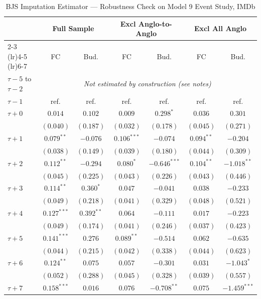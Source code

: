 \begin{table}[htbp]
\centering
\caption{BJS Imputation Estimator --- Robustness Check on Model 9 Event Study, IMDb}
\label{tab:bjs}
\footnotesize
\begin{tabular}{l cc cc cc }
\toprule
  & \multicolumn{2}{c}{Full Sample} & \multicolumn{2}{c}{Excl Anglo-to-Anglo} & \multicolumn{2}{c}{Excl All Anglo} \\
\cmidrule(lr){2-3}
\cmidrule(lr){4-5}
\cmidrule(lr){6-7}
  & FC & Bud. & FC & Bud. & FC & Bud. \\
\midrule
$\tau-5$ to $\tau-2$ & \multicolumn{6}{c}{\textit{Not estimated by construction (see notes)}} \\
$\tau-1$ & ref. & ref. & ref. & ref. & ref. & ref. \\
$\tau+0$ & $0.014$ & $0.102$ & $0.009$ & $0.298^{*}$ & $0.036$ & $0.301$ \\
 & $(0.040)$ & $(0.187)$ & $(0.032)$ & $(0.178)$ & $(0.045)$ & $(0.271)$ \\[2pt]
$\tau+1$ & $0.079^{**}$ & $-0.076$ & $0.106^{***}$ & $-0.074$ & $0.094^{**}$ & $-0.204$ \\
 & $(0.038)$ & $(0.149)$ & $(0.039)$ & $(0.180)$ & $(0.044)$ & $(0.309)$ \\[2pt]
$\tau+2$ & $0.112^{**}$ & $-0.294$ & $0.080^{*}$ & $-0.646^{***}$ & $0.104^{**}$ & $-1.018^{**}$ \\
 & $(0.045)$ & $(0.225)$ & $(0.043)$ & $(0.226)$ & $(0.043)$ & $(0.446)$ \\[2pt]
$\tau+3$ & $0.114^{**}$ & $0.360^{*}$ & $0.047$ & $-0.041$ & $0.038$ & $-0.233$ \\
 & $(0.049)$ & $(0.218)$ & $(0.041)$ & $(0.329)$ & $(0.048)$ & $(0.521)$ \\[2pt]
$\tau+4$ & $0.127^{***}$ & $0.392^{**}$ & $0.064$ & $-0.111$ & $0.017$ & $-0.223$ \\
 & $(0.049)$ & $(0.174)$ & $(0.041)$ & $(0.246)$ & $(0.037)$ & $(0.423)$ \\[2pt]
$\tau+5$ & $0.141^{***}$ & $0.276$ & $0.089^{**}$ & $-0.514$ & $0.062$ & $-0.635$ \\
 & $(0.044)$ & $(0.215)$ & $(0.042)$ & $(0.338)$ & $(0.044)$ & $(0.623)$ \\[2pt]
$\tau+6$ & $0.124^{**}$ & $0.075$ & $0.057$ & $-0.301$ & $0.031$ & $-1.043^{*}$ \\
 & $(0.052)$ & $(0.288)$ & $(0.045)$ & $(0.328)$ & $(0.039)$ & $(0.557)$ \\[2pt]
$\tau+7$ & $0.158^{***}$ & $0.016$ & $0.076$ & $-0.708^{**}$ & $0.075$ & $-1.459^{***}$ \\

\end{tabular}
\end{table}
